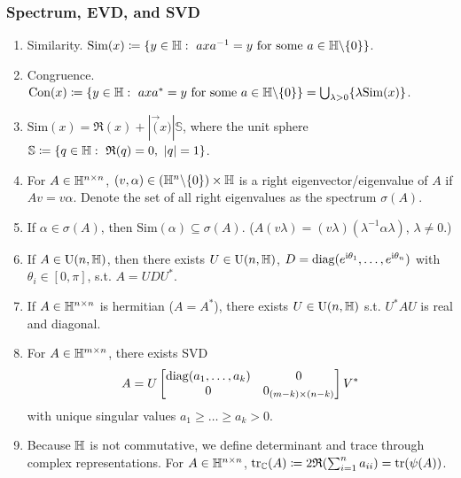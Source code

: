 \subsubsection{Spectrum, EVD, and SVD}
\begin{enumerate}
    \item \cite[Chapter~2.2]{rodman_2014_quaternion} Similarity. $\text{Sim}(x) \coloneqq \{y \in \mathbb{H}:\ axa^{-1}=y \text{~for~some~} a\in \mathbb{H} \backslash \{0\} \}$.
    \item Congruence. $\text{Con}(x) \coloneqq \{y \in \mathbb{H}:\ axa^*=y \text{~for~some~} a\in \mathbb{H} \backslash \{0\} \} = \bigcup_{\lambda >0} \{\lambda \text{Sim}(x)\}$. 
    \item $\text{Sim}(x)=\Re(x)+|\Vec(x)|\mathbb{S}$, where the unit sphere $\mathbb{S}\coloneqq \{q\in \mathbb{H}: \ \mathfrak{R}(q)=0,\ |q|=1 \}$.
    \item For $A\in \mathbb{H}^{n\times n}$, $(v,\alpha) \in (\mathbb{H}^n \backslash \{0\})\times \mathbb{H}$ is a right eigenvector/eigenvalue of $A$ if $Av=v\alpha$. Denote the set of all right eigenvalues as the spectrum $\sigma(A)$.
    \item If $\alpha \in \sigma(A)$, then $\text{Sim}(\alpha) \subseteq \sigma(A)$. ($A(v\lambda)=(v\lambda)(\lambda^{-1} \alpha \lambda)$, $\lambda\neq 0$.)
    \item \cite[Theorem~5.3.6]{rodman_2014_quaternion} If $A\in \operatorname{U}(n,\mathbb{H})$, then there exists $U\in \operatorname{U}(n,\mathbb{H})$, $D=\operatorname{diag}(e^{{\mathrm{i}}\theta_1},\dots,e^{{\mathrm{i}}\theta_n})$ with $\theta_i\in [0,\pi]$, s.t. $A=UDU^*$. 
    \item If $A\in \mathbb{H}^{n\times n}$ is hermitian ($A=A^*$), there exists $U\in \operatorname{U}(n,\mathbb{H})$ s.t. $U^*AU$ is real and diagonal.
    \item \cite[Proposition~3.2.5]{rodman_2014_quaternion} For $A\in \mathbb{H}^{m\times n}$, there exists SVD
    \[ A=U\begin{bmatrix}
        \operatorname{diag}(a_1,\dots,a_k) & 0 \\ 0 & 0_{(m-k)\times(n-k)}
    \end{bmatrix}V^* \]
    with unique singular values $a_1
    \ge \dots \ge a_k >0$.
    \item Because $\mathbb{H}$ is not commutative, we define determinant and trace through complex representations. For $A\in \mathbb{H}^{n\times n}$, $\operatorname{tr}_{\mathbb{C}}(A) \coloneqq 2 \mathfrak{R}(\sum_{i=1}^n a_{ii})=\operatorname{tr}(\psi(A))$. \cite[Section~5.9]{rodman_2014_quaternion} \cite[Definition~2.1]{Djokovic_2008_quaternion}
\end{enumerate}

